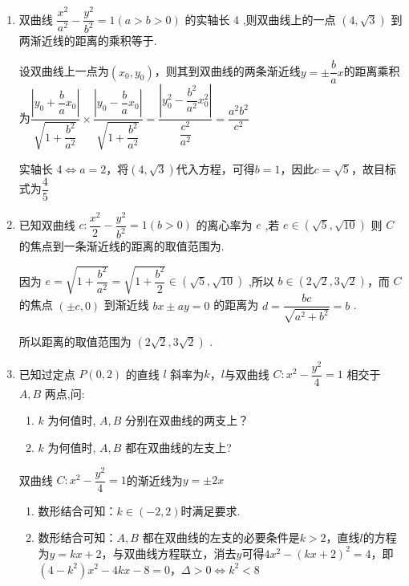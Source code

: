 \begin{enumerate}
\begin{jieda}
        所以 $S = \dfrac{1}{2}a{b}$ 是与点 $A$ 位置无关的常数.
    \end{jieda}
    \item 双曲线 $\dfrac{{x}^{2}}{{a}^{2}} - \dfrac{{y}^{2}}{{b}^{2}} = 1\left( {a > b > 0}\right)$ 的实轴长 4 ,则双曲线上的一点 $\left( {4,\sqrt{3}}\right)$ 到两渐近线的距离的乘积等于.
    \begin{jieda}
        设双曲线上一点为$(x_0, y_0)$，则其到双曲线的两条渐近线$y = \pm \dfrac{b}{a}x$的距离乘积为$\dfrac{\left|y_0 + \dfrac{b}{a}x_0\right|}{\sqrt{1+\dfrac{b^2}{a^2}}} \times \dfrac{\left|y_0 - \dfrac{b}{a}x_0\right|}{\sqrt{1+\dfrac{b^2}{a^2}}} = \dfrac{\left|y_0^2 - \dfrac{b^2}{a^2}x_0^2\right|}{\dfrac{c^2}{a^2}} = \dfrac{a^2b^2}{c^2}$

        实轴长 4$\Longleftrightarrow a = 2$，将$\left( {4,\sqrt{3}}\right)$代入方程，可得$b = 1$，因此$c = \sqrt{5}$，故目标式为$\dfrac{4}{5}$
    \end{jieda}
    \item 已知双曲线 $c : \dfrac{{x}^{2}}{2} - \dfrac{{y}^{2}}{{b}^{2}} = 1\left( {b > 0}\right)$ 的离心率为 $e$ ,若 $e \in  \left( {\sqrt{5},\sqrt{10}}\right)$ 则 $C$ 的焦点到一条渐近线的距离的取值范围为.
    \begin{jieda}
        因为 $e = \sqrt{1 + \dfrac{{b}^{2}}{{a}^{2}}} = \sqrt{1 + \dfrac{{b}^{2}}{2}} \in  \left( {\sqrt{5},\sqrt{10}}\right)$ ,所以 $b \in  \left( {2\sqrt{2},3\sqrt{2}}\right)$，而 $C$ 的焦点 $\left( {\pm c,0}\right)$ 到渐近线 ${bx} \pm  {ay} = 0$ 的距离为 $d = \dfrac{bc}{\sqrt{{a}^{2} + {b}^{2}}} = b$ .
        
        所以距离的取值范围为 $\left( {2\sqrt{2},3\sqrt{2}}\right)$ .
    \end{jieda}
    \item 已知过定点 $P\left( {0,2}\right)$ 的直线 $l$ 斜率为$k$，$l$与双曲线 $C : {x}^{2} - \dfrac{{y}^{2}}{4} = 1$ 相交于 $A,B$ 两点,问:
    \begin{enumerate}
        \item $k$ 为何值时, $A,B$ 分别在双曲线的两支上？
        \item $k$ 为何值时, $A,B$ 都在双曲线的左支上?
    \end{enumerate}
    \begin{jieda}
        双曲线 $C : {x}^{2} - \dfrac{{y}^{2}}{4} = 1$的渐近线为$y = \pm 2x$
        \begin{enumerate}
            \item 数形结合可知：$k \in (-2,2)$时满足要求.
            \item 数形结合可知：$A,B$ 都在双曲线的左支的必要条件是$k > 2$，直线$l$的方程为$y = kx + 2$，与双曲线方程联立，消去$y$可得$4x^2 - (kx+2)^2 = 4$，即$(4-k^2)x^2-4kx - 8 = 0$，$\Delta > 0 \Longleftrightarrow k^2 < 8$
            

\end{enumerate}
\end{jieda}
\end{enumerate}
